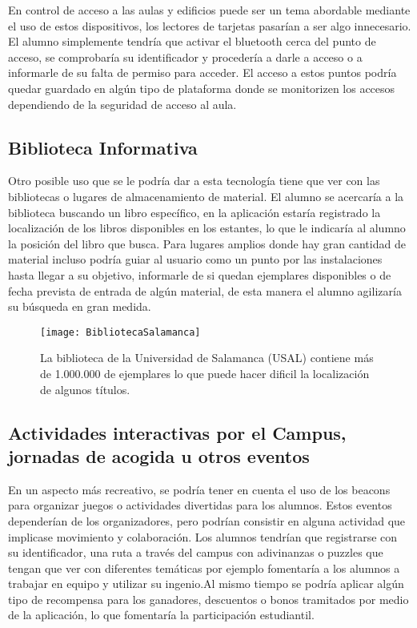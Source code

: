 En control de acceso a las aulas y edificios puede ser un tema abordable mediante el uso de estos dispositivos, los lectores de tarjetas pasarían a ser algo innecesario. El alumno simplemente tendría que activar el bluetooth cerca del punto de acceso, se comprobaría su identificador y procedería a darle a acceso o a informarle de su falta de permiso para acceder. El acceso a estos puntos podría quedar guardado en algún tipo de plataforma donde se monitorizen los accesos dependiendo de la seguridad de acceso al aula.

\subsection{Biblioteca Informativa}

Otro posible uso que se le podría dar a esta tecnología tiene que ver con las bibliotecas o lugares de almacenamiento de material. El alumno se acercaría a la biblioteca buscando un libro específico, en la aplicación estaría registrado la localización de los libros disponibles en los estantes, lo que le indicaría al alumno la posición del libro que busca. Para lugares amplios donde hay gran cantidad de material incluso podría guiar al usuario como un punto por las instalaciones hasta llegar a su objetivo, informarle de si quedan ejemplares disponibles o de fecha prevista de entrada de algún material, de esta manera el alumno agilizaría su búsqueda en gran medida.

\begin{figure}[H]
	\centering
	\texttt{[image: BibliotecaSalamanca]}
	\caption{La biblioteca de la Universidad de Salamanca (USAL) contiene más de 1.000.000 de ejemplares lo que puede hacer dificil la localización de algunos títulos.}
	\label{fig:bibliotecaUSAL}
\end{figure}

\subsection{Actividades interactivas por el Campus, jornadas de acogida u otros eventos}

En un aspecto más recreativo, se podría tener en cuenta el uso de los beacons para organizar juegos o actividades divertidas para los alumnos. Estos eventos dependerían de los organizadores, pero podrían consistir en alguna actividad que implicase movimiento y colaboración. Los alumnos tendrían que registrarse con su identificador, una ruta a través del campus con adivinanzas o puzzles que tengan que ver con diferentes temáticas por ejemplo fomentaría a los alumnos a trabajar en equipo y utilizar su ingenio.Al mismo tiempo se podría aplicar algún tipo de recompensa para los ganadores, descuentos o bonos tramitados por medio de la aplicación, lo que fomentaría la participación estudiantil.


